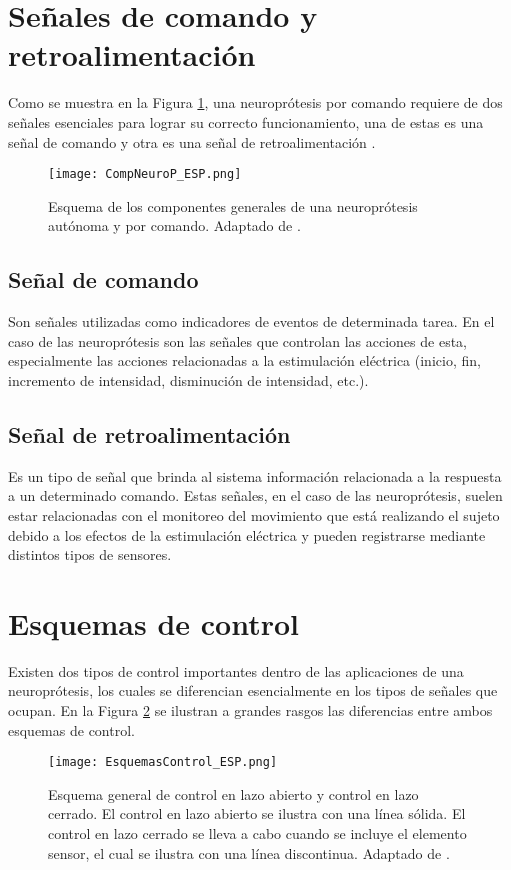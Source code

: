 \section{Señales de comando y retroalimentación}
Como se muestra en la Figura \ref{Figura: CompNeuroP}, una neuroprótesis por comando requiere de dos señales esenciales para lograr su correcto funcionamiento, una de estas es una señal de comando y otra es una señal de retroalimentación \cite{Popovic2015}.

\begin{figure}[htbp]
\centering
	\texttt{[image: CompNeuroP\_ESP.png]}
	\caption{Esquema de los componentes generales de una neuroprótesis autónoma y por comando. Adaptado de \cite{Popovic2015}.}
	\label{Figura: CompNeuroP}
\end{figure}

\subsection{Señal de comando}
Son señales utilizadas como indicadores de eventos de determinada tarea. En el caso de las neuroprótesis son las señales que controlan las acciones de esta, especialmente las acciones relacionadas a la estimulación eléctrica (inicio, fin, incremento de intensidad, disminución de intensidad, etc.).

\subsection{Señal de retroalimentación}
Es un tipo de señal que brinda al sistema información relacionada a la respuesta a un determinado comando. Estas señales, en el caso de las neuroprótesis, suelen estar relacionadas con el monitoreo del movimiento que está realizando el sujeto debido a los efectos de la estimulación eléctrica y pueden registrarse mediante distintos tipos de sensores.

\section{Esquemas de control}
Existen dos tipos de control importantes dentro de las aplicaciones de una neuroprótesis, los cuales se diferencian esencialmente en los tipos de señales que ocupan. En la Figura \ref{Figura: EsqCont} se ilustran a grandes rasgos las diferencias entre ambos esquemas de control.

\begin{figure}[htbp]
\centering
	\texttt{[image: EsquemasControl\_ESP.png]}
	\caption{Esquema general de control en lazo abierto y control en lazo cerrado. El control en lazo abierto se ilustra con una línea sólida. El control en lazo cerrado se lleva a cabo cuando se incluye el elemento sensor, el cual se ilustra con una línea discontinua. Adaptado de \cite{Wright2016}.}
	\label{Figura: EsqCont}
\end{figure}
